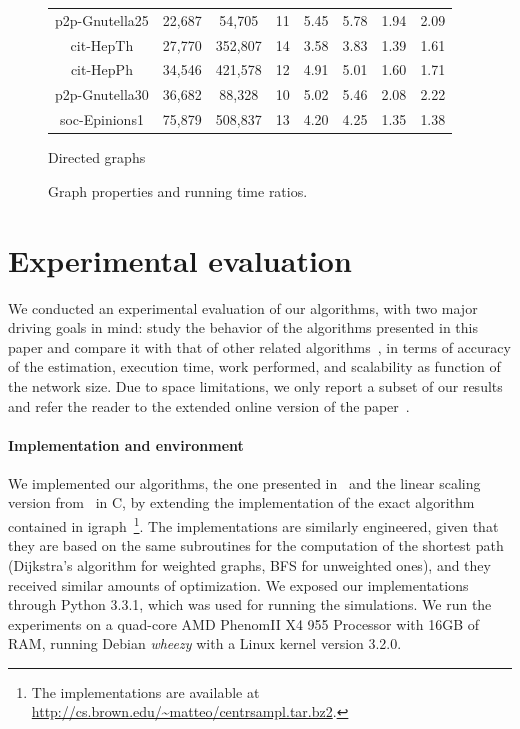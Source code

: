 \begin{figure}
\begin{subtable}[b]{0.47\textwidth}
\begin{small}
\begin{tabular}{cccccccc}
      p2p-Gnutella25 & 22,687 & 54,705 & 11 & 5.45 & 5.78 & 1.94 & 2.09 \\
      cit-HepTh & 27,770 & 352,807 & 14 & 3.58 & 3.83 & 1.39 & 1.61 \\
      cit-HepPh & 34,546 & 421,578 & 12 & 4.91 & 5.01 & 1.60 & 1.71 \\ 
      p2p-Gnutella30 & 36,682 & 88,328 & 10 & 5.02 & 5.46 & 2.08 & 2.22\\
      soc-Epinions1 & 75,879 & 508,837 & 13 & 4.20 & 4.25 & 1.35 & 1.38\\
      \bottomrule
    \end{tabular} 
  \end{small}
  \ifdmkd
  \else
  \caption{Directed graphs}
  \label{tab:expDir}
  \fi
  \end{subtable}
  \caption{Graph properties and running time ratios.}
  \label{fig:tables}
\end{figure}

\section{Experimental evaluation}\label{sec:exper}
We conducted an experimental evaluation of our algorithms, with two major
driving goals in mind: study the behavior of the algorithms presented in this
paper and compare it with that of other related
algorithms~\citep{Brandes01,BrandesP07,JacobKLPT05,GeisbergerSS08}, in terms of
accuracy of the estimation, execution time, work performed, and scalability as
function of the network size.
\ifproof 
\else
Due to space limitations, we only report a subset
of our results and refer the reader to the extended online version of the
paper~\citep{RiondatoK13}.
\fi

\paragraph{Implementation and environment}
We implemented our algorithms, the one presented in~\citep{BrandesP07,JacobKLPT05}
and the linear scaling version from~\citep{GeisbergerSS08} in C, by extending
the implementation of the exact algorithm~\citep{Brandes01} contained in
igraph~\citep{igraph}\footnote{The implementations are available at
\url{http://cs.brown.edu/~matteo/centrsampl.tar.bz2}.}. The implementations are similarly engineered, given that
they are based on the same subroutines for the computation of the shortest path
(Dijkstra's algorithm for weighted graphs, BFS for unweighted ones), and they
received similar amounts of optimization. We exposed our implementations through
Python 3.3.1, which was used for running the simulations. We run the experiments
on a quad-core AMD Phenom\texttrademark II X4 955 Processor with 16GB of RAM,
running Debian \emph{wheezy} with a Linux kernel version 3.2.0.

